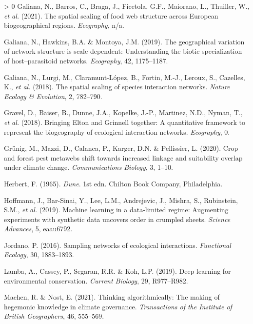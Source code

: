 \documentclass[10pt,oneside]{article}
\newlength{\cslhangindent}
\newenvironment{CSLReferences}[3] %
 {%
  \setlength{\parindent}{0pt}
  \ifodd #1 \everypar{\setlength{\hangindent}{\cslhangindent}}\ignorespaces\fi
  \ifnum #2 > 0
  \setlength{\parskip}{#2\baselineskip}
  \fi
 }%
 {}
\begin{document}
\begin{CSLReferences}{1}{0}
\leavevmode\hypertarget{ref-Galiana2021SpaSca}{}%
Galiana, N., Barros, C., Braga, J., Ficetola, G.F., Maiorano, L.,
Thuiller, W., \emph{et al.} (2021). The spatial scaling of food web
structure across European biogeographical regions. \emph{Ecography},
n/a.

\leavevmode\hypertarget{ref-Galiana2019GeoVar}{}%
Galiana, N., Hawkins, B.A. \& Montoya, J.M. (2019). The geographical
variation of network structure is scale dependent: Understanding the
biotic specialization of host--parasitoid networks. \emph{Ecography},
42, 1175--1187.

\leavevmode\hypertarget{ref-Galiana2018SpaSca}{}%
Galiana, N., Lurgi, M., Claramunt-López, B., Fortin, M.-J., Leroux, S.,
Cazelles, K., \emph{et al.} (2018). The spatial scaling of species
interaction networks. \emph{Nature Ecology \& Evolution}, 2, 782--790.

\leavevmode\hypertarget{ref-Gravel2018BriElt}{}%
Gravel, D., Baiser, B., Dunne, J.A., Kopelke, J.-P., Martinez, N.D.,
Nyman, T., \emph{et al.} (2018). Bringing Elton and Grinnell together: A
quantitative framework to represent the biogeography of ecological
interaction networks. \emph{Ecography}, 0.

\leavevmode\hypertarget{ref-Grunig2020CroFor}{}%
Grünig, M., Mazzi, D., Calanca, P., Karger, D.N. \& Pellissier, L.
(2020). Crop and forest pest metawebs shift towards increased linkage
and suitability overlap under climate change. \emph{Communications
Biology}, 3, 1--10.

\leavevmode\hypertarget{ref-Herbert1965Dun}{}%
Herbert, F. (1965). \emph{Dune}. 1st edn. Chilton Book Company,
Philadelphia.

\leavevmode\hypertarget{ref-Hoffmann2019MacLea}{}%
Hoffmann, J., Bar-Sinai, Y., Lee, L.M., Andrejevic, J., Mishra, S.,
Rubinstein, S.M., \emph{et al.} (2019). Machine learning in a
data-limited regime: Augmenting experiments with synthetic data uncovers
order in crumpled sheets. \emph{Science Advances}, 5, eaau6792.

\leavevmode\hypertarget{ref-Jordano2016SamNet}{}%
Jordano, P. (2016). Sampling networks of ecological interactions.
\emph{Functional Ecology}, 30, 1883--1893.

\leavevmode\hypertarget{ref-Lamba2019DeeLea}{}%
Lamba, A., Cassey, P., Segaran, R.R. \& Koh, L.P. (2019). Deep learning
for environmental conservation. \emph{Current Biology}, 29, R977--R982.

\leavevmode\hypertarget{ref-Machen2021ThiAlg}{}%
Machen, R. \& Nost, E. (2021). Thinking algorithmically: The making of
hegemonic knowledge in climate governance. \emph{Transactions of the
Institute of British Geographers}, 46, 555--569.


\end{CSLReferences}
\end{document}

